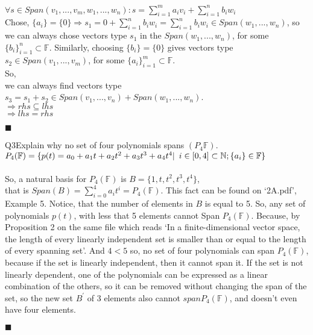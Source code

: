 \documentclass{article}
\begin{document}
$\forall s \in Span(v_1 ,
. . . , v_m , w_1 , . . . , w_n):
s = \sum_{i=1}^{m} a_iv_i +\sum_{i=1}^{n} b_iw_i$\\
Chose, $\{a_i\} = \{0\} \Rightarrow s_1 = 0 +\sum_{i=1}^{n} b_iw_i =
\sum_{i=1}^{n} b_iw_i \in Span(w_1, ... ,w_{n})$, so we can always
chose vectors type $s_1$ in the $Span(w_1, ... ,w_n)$, for some
$\{b_i\}_{i=1}^n \subset \mathbb{F}$. Similarly, choosing
$\{b_i\} = \{0\}$ gives vectors type $s_2 \in Span(v_1, ... ,v_m)$,
for some $\{a_i\}_{i=1}^m \subset \mathbb{F}$.\\
So,\\
we can always find vectors type $s_3 = s_1 + s_2 \in Span(v_1, ... , v_n)+ Span(w_1, ... ,w_n)$.\\
$\Rightarrow rhs \subseteq lhs$\\
$\Rightarrow lhs = rhs$\\
\begin{flushright}$\blacksquare$\end{flushright}
\newpage
Q3\quad Explain why no set of four polynomials spans
$(P_4\mathbb{F})$.\\

$P_4(\mathbb{F}) = \{p(t) = a_0 + a_1 t + a_2 t^2 + a_3 t^3+ a_4 t^4|\enskip
i \in [0,4] \subset \mathbb{N}; \{a_i\} \in \mathbb{F}\}$\\

\\
So, a natural basis for $P_4(\mathbb{F})$ is $B = \{
1,t,t^2,t^3,t^4\}$,\\ that is $Span(B) = \sum_{i=0}^4 a_it^i =
P_4(\mathbb{F})$. This fact can be found on `2A.pdf', Example 5. Notice, that the number of elements in $B$ is
equal to 5. So, any set of polynomials $p(t)$, with less that 5
elements cannot Span $P_4(\mathbb{F})$. Because, by Proposition 2 on
the same file which reads `In a finite-dimensional vector space, the length of
every linearly independent set
is smaller than or equal to the length of every spanning set'. And $4 < 5$ so, no set of
four polynomials can span $P_4(\mathbb{F})$, because if the set is
linearly independent, then it cannot span it. If the set is not
linearly dependent, one of the polynomials can be expressed as a
linear combination of the others, so it can be removed without
changing the span of the set, so the new set $B^\prime$ of 3 elements
also cannot $span P_4(\mathbb{F})$, and doesn't even have four elements.
\begin{flushright}$\blacksquare$\end{flushright}\\
\end{document}
